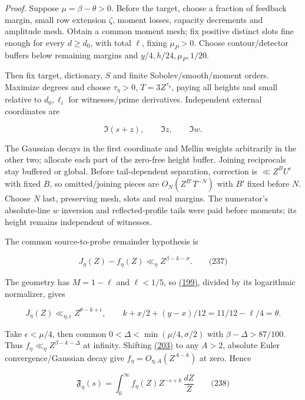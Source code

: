 \emph{Proof.} Suppose \(\mu=\beta-\theta>0\).
Before the target, choose a fraction of feedback margin, small row extension \(\zeta\), moment losses, capacity decrements and amplitude mesh. Obtain a common moment mesh; fix positive distinct slots fine enough for every \(d\ge d_0\), with total \(\ell\), fixing \(\mu_P>0\). Choose contour/detector buffers below remaining margins and \(y/4,h/24,\mu_P,1/20\).

Then fix target, dictionary, \(S\) and finite Sobolev/smooth/moment orders. Maximize degrees and choose \(\tau_\eta>0\), \(T=3Z^{\tau_\eta}\), paying all heights and small relative to \(d_0,\ell_i\) for witnesses/prime derivatives. Independent external coordinates are

\[
\Im(s+z),\qquad\Im z,\qquad\Im w.
\]

The Gaussian decays in the first coordinate and Mellin weights arbitrarily in the other two; allocate each part of the zero-free height buffer. Joining reciprocals stay buffered or global. Before tail-dependent separation, correction is \(\ll Z^B U^\epsilon\) with fixed \(B\), so omitted/joining pieces are \(O_N(Z^{B'}T^{-N})\) with \(B'\) fixed before \(N\). Choose \(N\) last, preserving mesh, slots and real margins. The numerator's absolute-line \(w\) inversion and reflected-profile tails were paid before moments; its height remains independent of witnesses.

The common source-to-probe remainder hypothesis is

\hypertarget{dr:remainder}{}

\label{dr:remainder}

\[
J_\eta(Z)-f_\eta(Z)\ll_\eta Z^{\beta-k-\sigma}.
 \qquad\text{(237)}
\]

The geometry has \(M=1-\ell\) and \(\ell<1/5\), so \protect\hyperlink{dr:physical-bound}{(199)}, divided by its logarithmic normalizer, gives

\[
J_\eta(Z)\ll_{\eta,\epsilon}Z^{\theta-k+\epsilon},\qquad
 k+x/2+(y-x)/12=11/12-\ell/4=\theta.
\]

Take \(\epsilon<\mu/4\), then common \(0<\Delta<\min(\mu/4,\sigma/2)\) with \(\beta-\Delta>87/100\). Thus \(f_\eta\ll_\eta Z^{\beta-k-\Delta}\) at infinity. Shifting \protect\hyperlink{dr:J-f}{(203)} to any \(A>2\), absolute Euler convergence/Gaussian decay give \(f_\eta=O_{\eta,A}(Z^{A-k})\) at zero. Hence

\hypertarget{dr:Mellin}{}

\label{dr:Mellin}

\[
\mathfrak F_\eta(s)=\int_0^\infty f_\eta(Z)Z^{-s+k}\,\frac{dZ}{Z}
 \qquad\text{(238)}
\]

